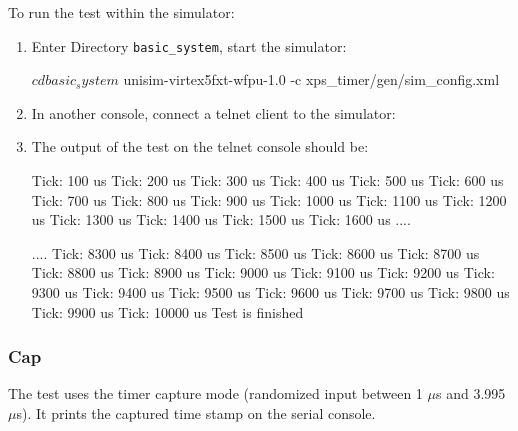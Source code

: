 \noindent To run the test within the simulator:
\begin{enumerate}
\item Enter Directory \texttt{basic\_system}, start the simulator:
\begin{script}
$ cd basic_system
$ unisim-virtex5fxt-wfpu-1.0 -c xps_timer/gen/sim_config.xml
\end{script}
\item In another console, connect a telnet client to the simulator:
\item The output of the test on the telnet console should be:
\begin{script}
Tick: 100 us
Tick: 200 us
Tick: 300 us
Tick: 400 us
Tick: 500 us
Tick: 600 us
Tick: 700 us
Tick: 800 us
Tick: 900 us
Tick: 1000 us
Tick: 1100 us
Tick: 1200 us
Tick: 1300 us
Tick: 1400 us
Tick: 1500 us
Tick: 1600 us
....

....
Tick: 8300 us
Tick: 8400 us
Tick: 8500 us
Tick: 8600 us
Tick: 8700 us
Tick: 8800 us
Tick: 8900 us
Tick: 9000 us
Tick: 9100 us
Tick: 9200 us
Tick: 9300 us
Tick: 9400 us
Tick: 9500 us
Tick: 9600 us
Tick: 9700 us
Tick: 9800 us
Tick: 9900 us
Tick: 10000 us
Test is finished
\end{script}
\end{enumerate}

\subsubsection{Cap}

The test uses the timer capture mode (randomized input between 1 $\mu$s and 3.995 $\mu$s).
It prints the captured time stamp on the serial console.

